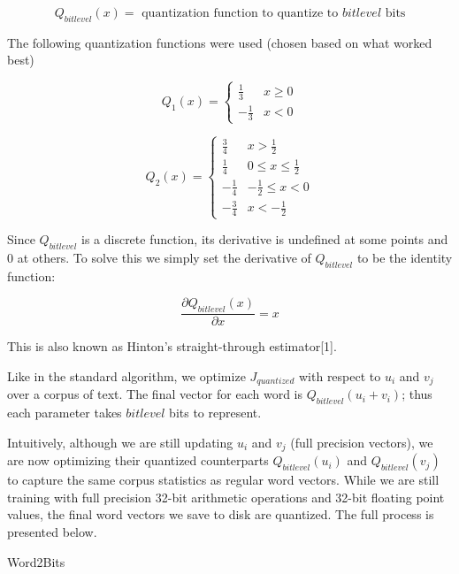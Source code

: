 \documentclass{article} %
\makeatletter
\def\BState{\State\hskip-\ALG@thistlm}
\makeatother
\begin{document}
$$
Q_{bitlevel}(x) = \mbox{ quantization function to quantize to } bitlevel \mbox{ bits}
$$

The following quantization functions were used (chosen based on what worked best)

\[
Q_1(x) =
\begin{cases}
  \frac{1}{3} & x \geq 0\\
  -\frac{1}{3} & x < 0
\end{cases}
\]


\[
Q_2(x) =
\begin{cases}
  \frac{3}{4} & x > \frac{1}{2}\\
  \frac{1}{4} & 0 \leq x \leq \frac{1}{2}\\
  -\frac{1}{4} & -\frac{1}{2} \leq x < 0\\
  -\frac{3}{4} & x < -\frac{1}{2}
\end{cases}
\]

Since $Q_{bitlevel}$ is a discrete function, its derivative is
undefined at some points and 0 at others. To solve this we simply set
the derivative of $Q_{bitlevel}$ to be the identity function:

$$
\frac{\partial Q_{bitlevel}(x)}{\partial x} = x
$$

This is also known as Hinton's straight-through estimator[1].

Like in the standard algorithm, we optimize $J_{quantized}$ with
respect to $u_i$ and $v_j$ over a corpus of text. The final vector
for each word is $Q_{bitlevel}(u_i + v_i)$; thus each parameter takes
$bitlevel$ bits to represent.

Intuitively, although we are still updating $u_i$ and $v_j$ (full
precision vectors), we are now optimizing their quantized
counterparts $Q_{bitlevel}(u_i)$ and $Q_{bitlevel}(v_j)$ to capture
the same corpus statistics as regular word vectors. While we are still
training with full precision 32-bit arithmetic operations and 32-bit floating
point values, the final word vectors we save to disk are
quantized. The full process is presented below.

\begin{algorithm}
\caption{Word2Bits}\label{euclid}
\end{algorithm}
\end{document}
